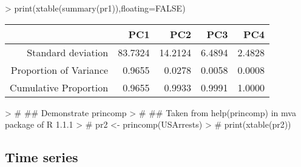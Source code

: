 \documentclass[letterpaper]{article}
\begin{document}
\begin{Schunk}
\begin{Sinput}
>   print(xtable(summary(pr1)),floating=FALSE)
\end{Sinput}
% latex table generated in R 3.1.1 by xtable 1.7-3 package
% 
\begin{tabular}{rrrrr}
  \hline
 & PC1 & PC2 & PC3 & PC4 \\ 
  \hline
Standard deviation & 83.7324 & 14.2124 & 6.4894 & 2.4828 \\ 
  Proportion of Variance & 0.9655 & 0.0278 & 0.0058 & 0.0008 \\ 
  Cumulative Proportion & 0.9655 & 0.9933 & 0.9991 & 1.0000 \\ 
   \hline
\end{tabular}\end{Schunk}



\begin{Schunk}
\begin{Sinput}
> #  ## Demonstrate princomp
> #  ## Taken from help(princomp) in mva package of R 1.1.1
> #  pr2 <- princomp(USArrests)
> #  print(xtable(pr2))
\end{Sinput}
\end{Schunk}
\subsection{Time series}
\end{document}
